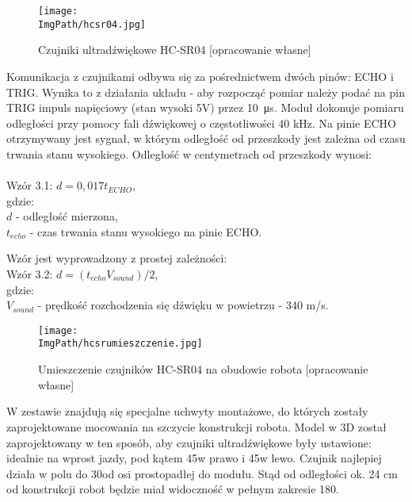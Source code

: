 \documentclass[a4paper,12pt,twoside,openany]{report}
\newcommand{\ImgPath}{.}
\begin{document}
\begin{figure}[!htbp]
	\begin{center}
\centering
\texttt{[image: \\ImgPath/hcsr04.jpg]}
\end{center}
	\caption{Czujniki ultradźwiękowe HC-SR04 [opracowanie własne]}
	\label{schematKomunikacji}
\end{figure}

Komunikacja z czujnikami odbywa się za pośrednictwem dwóch pinów: ECHO i TRIG. Wynika to z działania układu - aby rozpocząć pomiar należy podać na pin TRIG impuls napięciowy (stan wysoki 5V) przez \SI{10}{\micro s}. Moduł dokonuje pomiaru odległości przy pomocy fali dźwiękowej o częstotliwości 40 kHz. Na pinie ECHO otrzymywany jest sygnał, w którym odległość od przeszkody jest zależna od czasu trwania stanu wysokiego. Odległość w centymetrach od przeszkody wynosi:\\
\\
\noindent Wzór 3.1: $d = 0,017t_{ECHO}$,\\
gdzie:\\
$d$ - odległość mierzona,\\
$t_{echo}$ - czas trwania stanu wysokiego na pinie ECHO.

\newpage
\noindent Wzór jest wyprowadzony z prostej zależności:\\
Wzór 3.2: $d = (t_{echo}V_{sound})/2$,\\
gdzie:\\
$V_{sound}$ - prędkość rozchodzenia się dźwięku w powietrzu - 340 m/s.

\begin{figure}[!htbp]
	\begin{center}
\centering
\texttt{[image: \\ImgPath/hcsrumieszczenie.jpg]}
\end{center}
	\caption{Umieszczenie czujników HC-SR04 na obudowie robota [opracowanie własne]}
	\label{schematKomunikacji}
\end{figure}

W zestawie znajdują się specjalne uchwyty montażowe, do których zostały zaprojektowane mocowania na szczycie konstrukcji robota. Model w 3D został zaprojektowany w ten sposób, aby czujniki ultradźwiękowe były ustawione: idealnie na wprost jazdy, pod kątem 45\textdegree w prawo i 45\textdegree w lewo. Czujnik najlepiej działa w polu do 30\textdegree od osi prostopadłej do modułu. Stąd od odległości ok. 24 cm od konstrukcji robot będzie miał widoczność w pełnym zakresie 180\textdegree [Rysunek 3.30].
\end{document}
